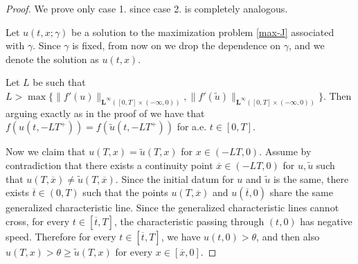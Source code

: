 \documentclass[a4paper, 10pt, final]{article}
\newcommand{\LL}[1]{\mathbf{L^{#1}}}
\begin{document}
\begin{proof} 
  We prove only case 1. since case 2. is completely analogous. 

  Let $u(t,x;\gamma)$ be  a solution to the maximization problem \eqref{max-J} associated with $\gamma$. 
   Since $\gamma$ is fixed, from now on we drop the dependence on $\gamma$, and we denote the solution as $u(t,x)$. 
  
  Let $L$ be such that $L> \max\{ \|f'(u)\|_{\LL\infty([0,T]\times (-\infty, 0))}, 
  \|f'(\widetilde u)\|_{\LL\infty([0,T]\times (-\infty, 0))}\}$. Then arguing exactly as in the proof of 
    we have that $f(u(t, -LT^+)) = f(\widetilde u(t, -LT^+))$ for a.e. $t\in [0,T]$. 
  
%
   

  Now we claim that 
  $u(T,x)=\widetilde u(T,x)$ for $x\in ( -LT,0)$.  
  Assume by contradiction that  there exists a continuity point $\overline{x}\in (-LT,0)$ for $u, \widetilde u$ such  
  that $u(T,\overline{x})\neq \widetilde u(T,\overline{x})$. 
  Since the initial datum for $u$ and $\widetilde u$ is the same, 
  there exists $\overline{t} \in (0,T)$ such that the 
  points $u(T, \overline{x})$ and $u(\overline{t},0)$ share the same generalized characteristic line. 
  Since the generalized characteristic lines cannot cross, for every $t\in [\overline{t}, T]$, the characteristic 
  passing through $(t,0)$ has negative speed. Therefore 
  for every $t\in [\overline{t}, T]$, we have $u(t,0)>\theta$, 
  and then also  $u(T,x)>\theta\geq \widetilde u(T,x)$ for every $x\in[\overline{x}, 0]$. 


\end{proof}
\end{document}
